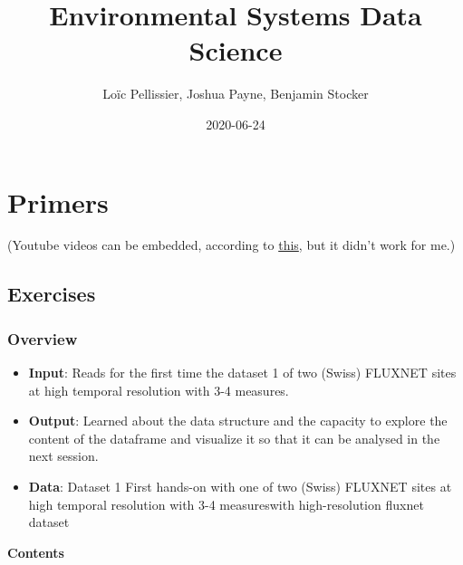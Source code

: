 \documentclass[]{book}
\title{Environmental Systems Data Science}
\author{Loïc Pellissier, Joshua Payne, Benjamin Stocker}
\date{2020-06-24}
\providecommand{\tightlist}{%
  \setlength{\itemsep}{0pt}\setlength{\parskip}{0pt}}
\begin{document}
\maketitle

{
\setcounter{tocdepth}{1}
\tableofcontents
}
\hypertarget{primers}{%
\chapter{Primers}\label{primers}}

(Youtube videos can be embedded, according to \href{https://bookdown.org/yihui/rmarkdown/learnr-videos.html}{this}, but it didn't work for me.)

\hypertarget{exercises}{%
\section{Exercises}\label{exercises}}

\hypertarget{overview}{%
\subsection{Overview}\label{overview}}

\begin{itemize}
\tightlist
\item
  \textbf{Input}: Reads for the first time the dataset 1 of two (Swiss) FLUXNET sites at high temporal resolution with 3-4 measures.
\item
  \textbf{Output}: Learned about the data structure and the capacity to explore the content of the dataframe and visualize it so that it can be analysed in the next session.
\item
  \textbf{Data}: Dataset 1 First hands-on with one of two (Swiss) FLUXNET sites at high temporal resolution with 3-4 measureswith high-resolution fluxnet dataset
\end{itemize}

\textbf{Contents}
\end{document}
